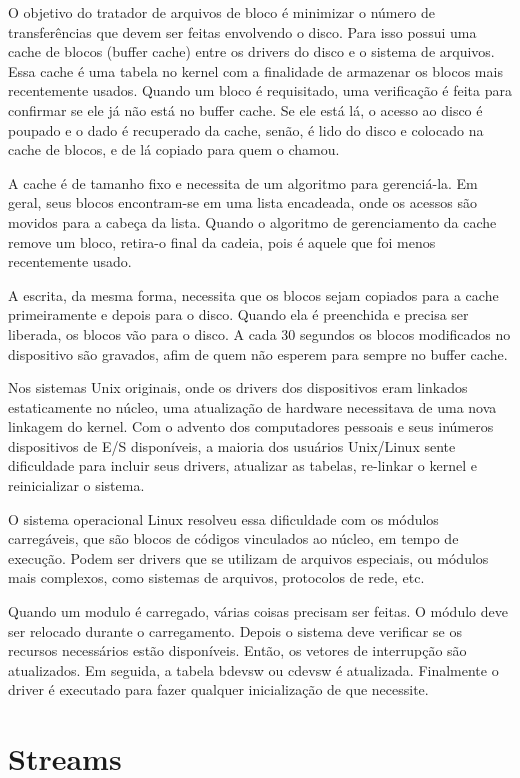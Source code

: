 O objetivo do tratador de arquivos de bloco é minimizar o número de transferências que devem ser feitas envolvendo o disco. Para isso possui uma cache de blocos (buffer cache) entre os drivers do disco e o sistema de arquivos. Essa cache é uma tabela no kernel com a finalidade de armazenar os blocos mais recentemente usados. Quando um bloco é requisitado, uma verificação é feita para confirmar se ele já não está no buffer cache. Se ele está lá, o acesso ao disco é poupado e o dado é recuperado da cache, senão, é lido do disco e colocado na cache de blocos, e de lá copiado para quem o chamou.

A cache é de tamanho fixo e necessita de um algoritmo para gerenciá-la. Em geral, seus blocos encontram-se em uma lista encadeada, onde os acessos são movidos para a cabeça da lista. Quando o algoritmo de gerenciamento da cache remove um bloco, retira-o final da cadeia, pois é aquele que foi menos recentemente usado.

A escrita, da mesma forma, necessita que os blocos sejam copiados para a cache primeiramente e depois para o disco. Quando ela é preenchida e precisa ser liberada, os blocos vão para o disco. A cada 30 segundos os blocos modificados no dispositivo são gravados, afim de quem não esperem para sempre no buffer cache.

Nos sistemas Unix originais, onde os drivers dos dispositivos eram linkados estaticamente no núcleo, uma atualização de hardware necessitava de uma nova linkagem do kernel. Com o advento dos computadores pessoais e seus inúmeros dispositivos de E/S disponíveis, a maioria dos usuários Unix/Linux sente dificuldade para incluir seus drivers, atualizar as tabelas, re-linkar o kernel e reinicializar o sistema.

O sistema operacional Linux resolveu essa dificuldade com os módulos carregáveis, que são blocos de códigos vinculados ao núcleo, em tempo de execução. Podem ser drivers que se utilizam de arquivos especiais, ou módulos mais complexos, como sistemas de arquivos, protocolos de rede, etc.

Quando um modulo é carregado, várias coisas precisam ser feitas. O módulo deve ser relocado durante o carregamento. Depois o sistema deve verificar se os recursos necessários estão disponíveis. Então, os vetores de interrupção são atualizados. Em seguida, a tabela bdevsw ou cdevsw é atualizada. Finalmente o driver é executado para fazer qualquer inicialização de que necessite.

\section{Streams}

